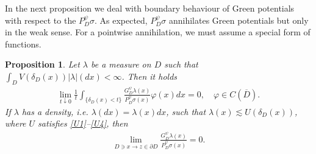 \documentclass[12pt,a4paper,onecolumn]{article}
\newtheorem{prop}[thm]{Proposition}
\theoremstyle{definition}
\newcommand{\1}{\mathbf 1}
\newcommand{\de}{\delta_D}
\newcommand{\GDP}{G_D^\psi}
\newcommand{\PDS}{P^{\psi}_{ D}}
\numberwithin{equation}{section}
\begin{document}
	
	In the next proposition we deal with boundary behaviour of Green potentials with respect to the $\PDS\sigma$. As expected, $\PDS\sigma$ annihilates Green potentials but only in the weak sense. For a pointwise annihilation, we must assume a special form of functions.
	\begin{prop}\label{p:boundary operator GD lambda}
	    Let $\lambda$ be a measure on $D$ such that $\int_D V(\de(x))|\lambda|(dx)<\infty$. Then it holds
        \begin{align*}
            \lim_{t\downarrow 0}\frac{1}{t}\int_{\{\de(x)<t\}}\frac{\GDP \lambda(x)}{\PDS\sigma(x)}\varphi(x)dx=0,\quad \varphi\in C(\overline D).
        \end{align*}
        If $\lambda$ has a density, i.e. $\lambda(dx)=\lambda(x)dx$, such that $\lambda(x)\lesssim U(\de(x))$, where $U$ satisfies \ref{U1}--\ref{U4}, then
        \begin{align}\label{e:1040}
        	\lim_{D\ni x\to z\in\partial D}\frac{\GDP
        		\lambda(x)}{\PDS\sigma(x)}=0.
        \end{align}
	\end{prop}
\end{document}
